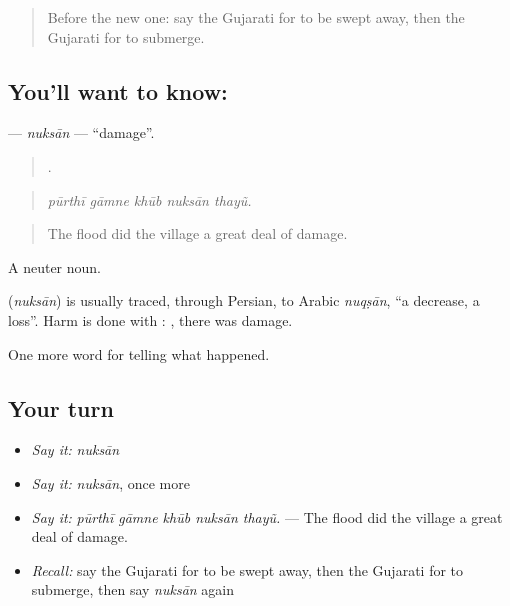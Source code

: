 \label{lesson:GU-C304-nuksan}



\begin{quote}
Before the new one: say the Gujarati for to be swept away, then the Gujarati for to submerge.
\end{quote}

\subsection*{You'll want to know: }
\textbf{} — \emph{nuksān} — \textquotedblleft{}damage\textquotedblright{}.

\begin{quote}
    .
\end{quote}

\begin{quote}
\emph{pūrthī gāmne khūb nuksān thayũ.}
\end{quote}

\begin{quote}
The flood did the village a great deal of damage.
\end{quote}

A neuter noun.

\begin{cousinweb}
\textbf{} (\emph{nuksān}) is usually traced, through Persian, to Arabic \emph{nuqṣān}, \textquotedblleft{}a decrease, a loss\textquotedblright{}. Harm is done with \textbf{}: \textbf{ }, there was damage.
\end{cousinweb}

\begin{grammarlens}[title={What you've built}]
One more word for telling what happened.
\end{grammarlens}

\subsection*{Your turn}
\begin{itemize}
\raggedright
  \item \emph{Say it:} \emph{nuksān}
  \item \emph{Say it:} \emph{nuksān}, once more
  \item \emph{Say it:} \emph{pūrthī gāmne khūb nuksān thayũ.} — The flood did the village a great deal of damage.
  \item \emph{Recall:} say the Gujarati for to be swept away, then the Gujarati for to submerge, then say \emph{nuksān} again
\end{itemize}

